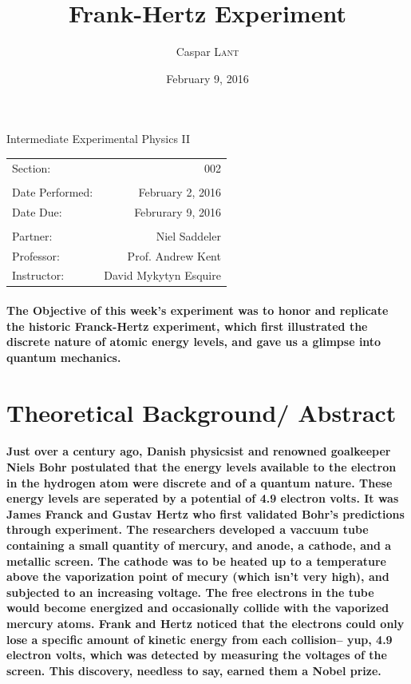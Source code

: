 \documentclass{amsart}
\title{Frank-Hertz Experiment}
\author{Caspar \textsc{Lant}} %
\date{February 9, 2016} %
\begin{document}
\bigskip

\maketitle %
\begin{center}

Intermediate Experimental Physics II\\
\vspace{1.5cm}

\begin{tabular}{l r}

Section: & 002\\
\\
Date Performed: & February 2, 2016 \\ %
Date Due: & Februrary 9, 2016\\
\\
Partner: & Niel Saddeler \\ %
Professor: & Prof. Andrew Kent\\
Instructor: & David Mykytyn Esquire %
\end{tabular}
\end{center}
\vspace{50mm}
\pagebreak

\paragraph{\textbf{The Objective} of this week's experiment was to honor and replicate the historic Franck-Hertz experiment, which first illustrated the discrete nature of atomic energy levels, and gave us a glimpse into quantum mechanics.}

\section{Theoretical Background/ Abstract}
\paragraph{Just over a century ago, Danish physicsist and renowned goalkeeper Niels Bohr postulated that the energy levels available to the electron in the hydrogen atom were discrete and of a quantum nature. These energy levels are seperated by a potential of 4.9 electron volts. It was James Franck and Gustav Hertz who first validated Bohr's predictions through experiment. The researchers developed a vaccuum tube containing a small quantity of mercury, and anode, a cathode, and a metallic screen. The cathode was to be heated up to a temperature above the vaporization point of mecury (which isn't very high), and subjected to an increasing voltage. The free electrons in the tube would become energized and occasionally collide with the vaporized mercury atoms. Frank and Hertz noticed that the electrons could only lose a specific amount of kinetic energy from each collision\--- yup, 4.9 electron volts, which was detected by measuring the voltages of the screen. This discovery, needless to say, earned them a Nobel prize.}
\end{document}
